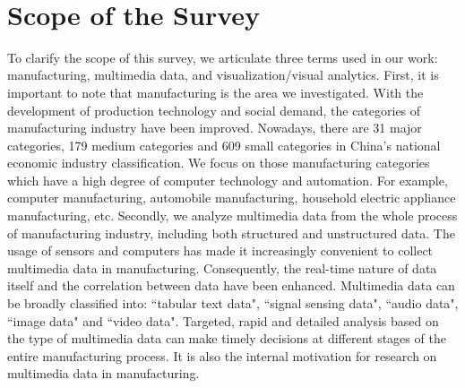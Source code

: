 \documentclass[a4paper,fleqn]{cas-dc}
\begin{document}
 


\section{Scope of the Survey}
To clarify the scope of this survey, we articulate three terms used in our work: manufacturing, multimedia data, and visualization/visual analytics.
First, it is important to note that manufacturing is the area we investigated.
With the development of production technology and social demand, the categories of manufacturing industry have been improved.
Nowadays, there are 31 major categories, 179 medium categories and 609 small categories in China's national economic industry classification.
We focus on those manufacturing categories which have a high degree of computer technology and automation.
For example, computer manufacturing, automobile manufacturing, household electric appliance manufacturing, etc.
Secondly, we analyze multimedia data from the whole process of manufacturing industry, including both structured and unstructured data. 
The usage of sensors and computers has made it increasingly convenient to collect multimedia data in manufacturing.
Consequently, the real-time nature of data itself and the correlation between data have been enhanced.
Multimedia data can be broadly classified into: ``tabular text data", ``signal sensing data", ``audio data", ``image data" and ``video data".
Targeted, rapid and detailed analysis based on the type of multimedia data can make timely decisions at different stages of the entire manufacturing process.
It is also the internal motivation for research on multimedia data in manufacturing.
\end{document}
